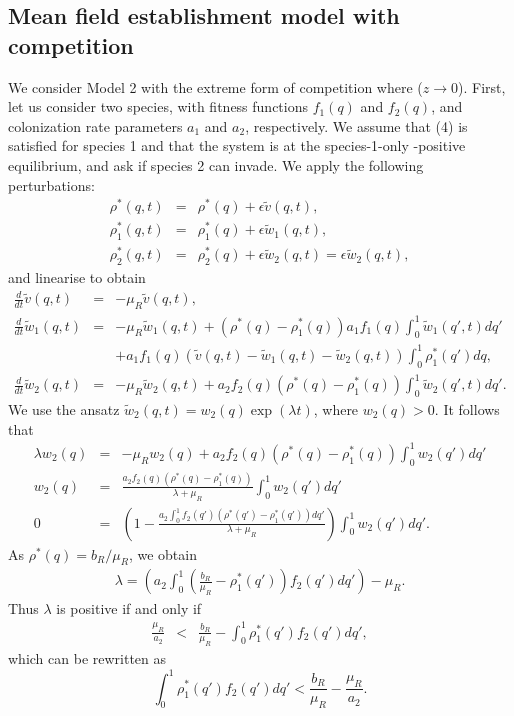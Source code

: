 \documentclass[8pt,a4paper]{article}
\begin{document}
\subsection{Mean field establishment model with competition}
We consider Model 2 with the  extreme form of competition where ($z \rightarrow 0$). First, let us consider two species, with fitness functions $f_1(q)$ and $f_2(q)$, and colonization rate parameters $a_1$ and $a_2$, respectively. We assume that (4) is satisfied for species 1 and that the system is at the species-1-only -positive equilibrium, and ask if species 2 can  invade. We apply the following perturbations: 
\begin{eqnarray*}
 \rho^*(q,t)&= &\rho^*(q)+\epsilon \tilde{v}(q,t), \\
 \rho_1^*(q,t)&= &\rho_1^*(q)+\epsilon \tilde{w}_1(q,t), \\
 \rho_2^*(q,t)&= &\rho_2^*(q)+\epsilon \tilde{w}_2(q,t)=\epsilon \tilde{w}_2(q,t),
\end{eqnarray*} 
and linearise to obtain 
\begin{eqnarray*}
\frac{d}{dt} \tilde{v}(q,t) &=& - \mu_R \tilde{v}(q,t),\\
\frac{d}{d t} \tilde{w}_1(q,t) &=& -\mu_R \tilde{w}_1(q,t)+\left(\rho^*(q)-\rho_1^*(q)\right)a_1 f_1(q)\int_0^1 \tilde{w}_1(q',t) dq' \\
& & + a_1 f_1(q) \left(\tilde{v}(q,t)-\tilde{w}_1(q,t)-\tilde{w}_2(q,t)\right)\int_0^1 \rho_1^*(q')dq ,\\
\frac{d}{d t} \tilde{w}_2(q,t) &=& -\mu_R \tilde{w}_2(q,t)+ a_2 f_2(q) \left(\rho^*(q)-\rho_1^*(q)\right) \int_0^1 \tilde{w}_2(q',t) dq'.
\end{eqnarray*}
We use the ansatz  $\tilde{w}_2(q,t)=w_2(q) \exp(\lambda t)$, where $ w_2(q) >0 $. It follows that
\begin{eqnarray*}
\lambda w_2(q)&=& -\mu_R w_2(q)+ a_2 f_2(q)  \left(\rho^*(q)-\rho_1^*(q) \right) \int_0^1 w_2(q') dq'\\ 
w_2(q)&=&\frac{a_2 f_2(q) \left(\rho^*(q)-\rho_1^*(q) \right)}{\lambda + \mu_R} \int_0^1 w_2(q') dq'\\
0&=&\left(1-\frac{a_2 \int_0^1  f_2(q') \left(\rho^*(q')-\rho_1^*(q') \right)dq'}{\lambda + \mu_R} \right)  \int_0^1 w_2(q') dq'.
\end{eqnarray*} 
As $\rho^*(q)= b_R/\mu_R$, we obtain 
\begin{eqnarray*}
 \lambda =\left( a_2 \int_0^1 \left( \frac{b_R}{\mu_R} - \rho_1^*(q')\right) f_2(q')dq' \right)-\mu_R. 
\end{eqnarray*}
Thus $\lambda$ is positive if and only if
\begin{eqnarray*}
 \frac{\mu_R}{a_2} & < &\frac{b_R}{\mu_R} -\int_0^1 \rho_1^*(q') f_2(q') dq',
\end{eqnarray*}
which can be rewritten as 
\begin{equation}
\int_0^1 \rho_1^*(q') f_2(q')dq'  < \frac{b_R}{\mu_R} -\frac{\mu_R}{a_2}. 
\end{equation}
\end{document}
